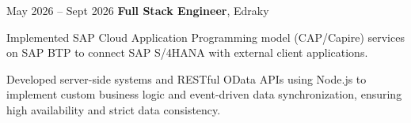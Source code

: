 \begin{twocolentry}{
            May 2026 – Sept 2026
        }
\textbf{Full Stack Engineer}, Edraky\end{twocolentry}

\vspace{0.10 cm}
\begin{onecolentry}
    \begin{highlights}
        \item Implemented SAP Cloud Application Programming model (CAP/Capire) services on SAP BTP to connect SAP S/4HANA with external client applications.
        \item Developed server-side systems and RESTful OData APIs using Node.js to implement custom business logic and event-driven data synchronization, ensuring high availability and strict data consistency.
    \end{highlights}
\end{onecolentry}
